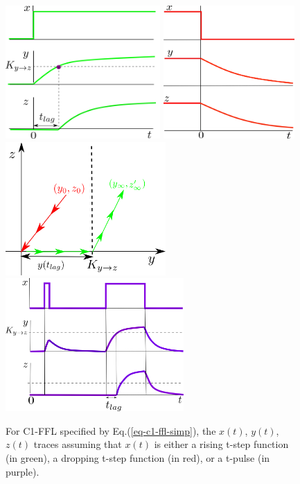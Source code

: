 \begin{figure}[h!]
\centering
\includegraphics[height=2in]
{autoregulons/c1-ffl-up-green.png}
\includegraphics[height=2in]
{autoregulons/c1-ffl-down-green.png}
\includegraphics[height=2in]
{autoregulons/two-paths-y-z-plane.png}
\includegraphics[height=2in]
{autoregulons/c1-ffl-up-down-green.png}
\caption{For C1-FFL
specified by Eq.(\ref{eq-c1-ffl-simp}),
the $x(t)$, $y(t)$, $z(t)$ traces assuming 
that $x(t)$ is either a rising
 t-step function (in green),
a dropping t-step function (in red),
or a t-pulse  (in purple).}
\label{fig-c1-ffl-triple}
\end{figure}

